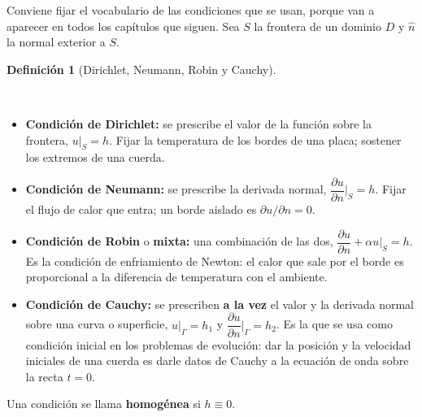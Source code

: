 \documentclass[
  spanish,
  a4paper,
]{scrbook}
\providecommand{\tightlist}{%
  \setlength{\itemsep}{0pt}\setlength{\parskip}{0pt}}
\theoremstyle{definition}
\newtheorem{definition}{Definición}[chapter]
\theoremstyle{plain}
\theoremstyle{definition}
\theoremstyle{plain}
\theoremstyle{definition}
\theoremstyle{remark}
\begin{document}
Conviene fijar el vocabulario de las condiciones que se usan, porque van
a aparecer en todos los capítulos que siguen. Sea \(S\) la frontera de
un dominio \(D\) y \(\hat n\) la normal exterior a \(S\).

\begin{definition}[Dirichlet, Neumann, Robin y
Cauchy]\protect\hypertarget{def-condiciones}{}\label{def-condiciones}

~

\begin{itemize}
\tightlist
\item
  \textbf{Condición de Dirichlet:} se prescribe el valor de la función
  sobre la frontera, \(u\big|_S = h\). Fijar la temperatura de los
  bordes de una placa; sostener los extremos de una cuerda.
\item
  \textbf{Condición de Neumann:} se prescribe la derivada normal,
  \(\dfrac{\partial u}{\partial n}\Big|_S = h\). Fijar el flujo de calor
  que entra; un borde aislado es \(\partial u/\partial n = 0\).
\item
  \textbf{Condición de Robin} o \textbf{mixta:} una combinación de las
  dos, \(\dfrac{\partial u}{\partial n} + \alpha u\Big|_S = h\). Es la
  condición de enfriamiento de Newton: el calor que sale por el borde es
  proporcional a la diferencia de temperatura con el ambiente.
\item
  \textbf{Condición de Cauchy:} se prescriben \textbf{a la vez} el valor
  y la derivada normal sobre una curva o superficie,
  \(u\big|_\Gamma = h_1\) y
  \(\dfrac{\partial u}{\partial n}\Big|_\Gamma = h_2\). Es la que se usa
  como condición inicial en los problemas de evolución: dar la posición
  y la velocidad iniciales de una cuerda es darle datos de Cauchy a la
  ecuación de onda sobre la recta \(t=0\).
\end{itemize}

Una condición se llama \textbf{homogénea} si \(h \equiv 0\).

\end{definition}
\end{document}
